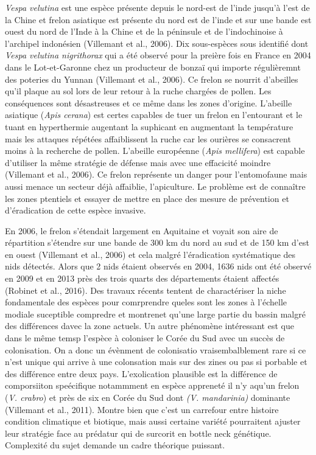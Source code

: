 \emph{Vespa velutina} est une espèce présente depuis le nord-est de
l'inde jusqu'à l'est de la Chine et frelon asiatique est présente du
nord est de l'inde et sur une bande est ouest du nord de l'Inde à la
Chine et de la péninsule et de l'indochinoise à l'archipel indonésien
(Villemant et al., 2006). Dix sous-espèces sous identifié dont
\emph{Vespa velutina nigrithorax} qui a été observé pour la preière fois
en France en 2004 dans le Lot-et-Garonne chez un producteur de bonzaï
qui importe régulièremnt des poteries du Yunnan (Villemant et al.,
2006). Ce frelon se nourrit d'abeilles qu'il plaque au sol lors de leur
retour à la ruche chargées de pollen. Les conséquences sont désastreuses
et ce même dans les zones d'origine. L'abeille asiatique (\emph{Apis
cerana}) est certes capables de tuer un frelon en l'entourant et le
tuant en hyperthermie augentant la suphicant en augmentant la
température mais les attaques répétées affaiblissent la ruche car les
ourières se consacrent moins à la recherche de pollen. L'abeille
européenne (\emph{Apis mellifera}) est capable d'utiliser la même
stratégie de défense mais avec une effacicité moindre (Villemant et al.,
2006). Ce frelon représente un danger pour l'entomofaune mais aussi
menace un secteur déjà affaiblie, l'apiculture. Le problème est de
connaître les zones ptentiels et essayer de mettre en place des mesure
de prévention et d'éradication de cette espèce invasive.

En 2006, le frelon s'étendait largement en Aquitaine et voyait son aire
de répartition s'étendre sur une bande de 300 km du nord au sud et de
150 km d'est en ouest (Villemant et al., 2006) et cela malgré
l'éradication systématique des nids détectés. Alors que 2 nids étaient
observés en 2004, 1636 nids ont été observé en 2009 et en 2013 près des
trois quarts des départements étaient affectés (Robinet et al., 2016).
Des travaux récents tentent de charactériser la niche fondamentale des
espèces pour comrprendre queles sont les zones à l'échelle modiale
suceptible compredre et montrenet qu'une large partie du bassin malgré
des différences davec la zone actuels. Un autre phénomène intéressant
est que dans le même temsp l'espèce à coloniser le Corée du Sud avec un
succès de colonisation. On a donc un évènment de colonisatio
vraisembalblement rare si ce n'est unique qui arrive à une colonsation
mais sur des zines ou pas si porbable et des différence entre deux pays.
L'exolication plausible est la différence de comporsiiton speécifique
notammment en espèce appreneté il n'y aqu'un frelon (\emph{V. crabro})
et près de six en Corée du Sud dont \emph{(V. mandarinia)} dominante
(Villemant et al., 2011). Montre bien que c'est un carrefour entre
histoire condition climatique et biotique, mais aussi certaine variété
pourraitent ajuster leur stratégie face au prédatur qui de surcorit en
bottle neck génétique. Complexité du sujet demande un cadre théorique
puissant.

